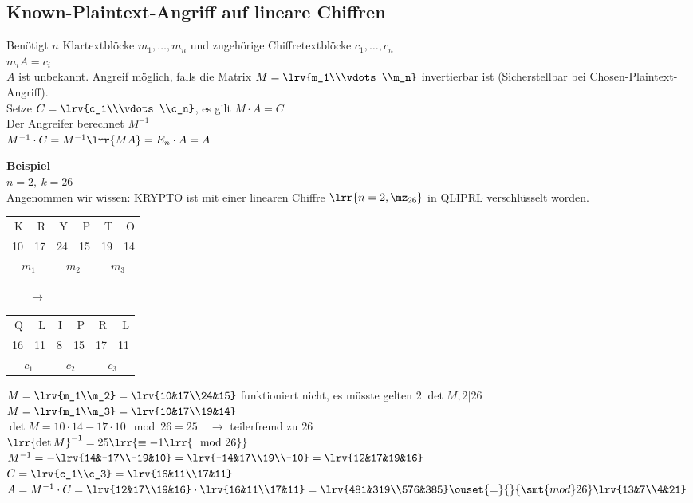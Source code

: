 	\subsection{Known-Plaintext-Angriff auf lineare Chiffren}
		Benötigt $n$ Klartextblöcke $m_1,\dots,m_n$ und zugehörige Chiffretextblöcke $c_1,\dots,c_n$\\
		$m_iA=c_i$\\
		$A$ ist unbekannt. Angreif möglich, falls die Matrix $M=\lrv{m_1\\\vdots\\m_n}$ invertierbar ist (Sicherstellbar bei Chosen-Plaintext-Angriff).\\
		Setze $C=\lrv{c_1\\\vdots\\c_n}$, es gilt $M\cdot A=C$\\
		Der Angreifer berechnet $M^{-1}$\\
		$M^{-1}\cdot C = M^{-1}\lrr{MA}=E_n\cdot A = A$
		
		\textbf{Beispiel}\\
		$n=2,\ k=26$\\
		Angenommen wir wissen: KRYPTO ist mit einer linearen Chiffre $\lrr{n=2,\mz_{26}}$ in QLIPRL verschlüsselt worden.
		
		\begin{tabular}{rr|rr|rr}
			K&R&Y&P&T&O\\
			10&17&24&15&19&14\\
			\multicolumn{2}{c|}{$m_1$}&\multicolumn{2}{c|}{$m_2$}&\multicolumn{2}{c}{$m_3$}
		\end{tabular}
		$\qquad \rightarrow\qquad$
		\begin{tabular}{rr|rr|rr}
			Q&L&I&P&R&L\\
			16&11&8&15&17&11\\
			\multicolumn{2}{c|}{$c_1$}&\multicolumn{2}{c|}{$c_2$}&\multicolumn{2}{c}{$c_3$}
		\end{tabular}
		
		$M = \lrv{m_1\\m_2}=\lrv{10&17\\24&15}$ funktioniert nicht, es müsste gelten $2|\det M, 2|26$\\
		$M=\lrv{m_1\\m_3}=\lrv{10&17\\19&14}$\\
		$\det M = 10\cdot 14 - 17\cdot 10 \mod 26 = 25\quad\rightarrow$ teilerfremd zu $26$\\
		$\lrr{\det M}^{-1} = 25\lrr{\equiv-1\lrr{\mod 26}}$\\
		$M^{-1} = -\lrv{14&-17\\-19&10} = \lrv{-14&17\\19\\-10}=\lrv{12&17&19&16}$\\
		$C=\lrv{c_1\\c_3}=\lrv{16&11\\17&11}$\\
		$A=M^{-1}\cdot C = \lrv{12&17\\19&16}\cdot\lrv{16&11\\17&11}=\lrv{481&319\\576&385}\ouset{=}{}{\smt{mod } 26}\lrv{13&7\\4&21}$
		
